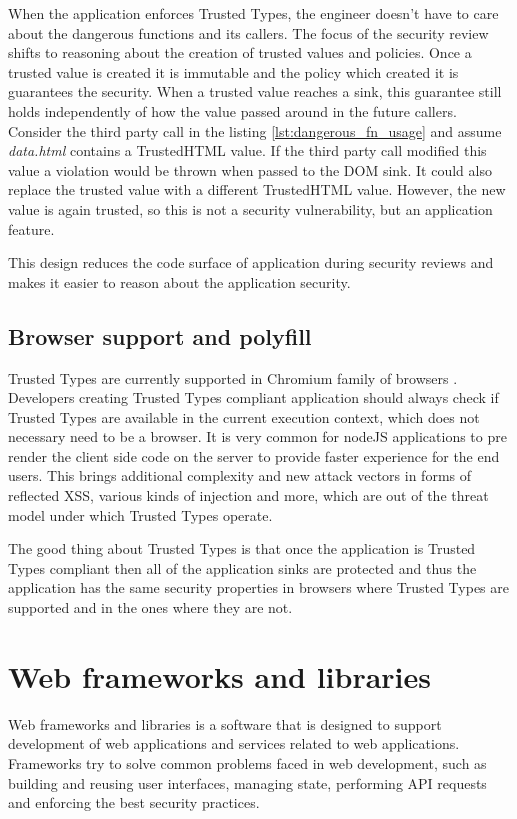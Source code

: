 When the application enforces Trusted Types, the engineer doesn't have to care about the dangerous
functions and its callers. The focus of the security review shifts to reasoning about the creation
of trusted values and policies. Once a trusted value is created it is immutable and the policy which
created it is guarantees the security. When a trusted value reaches a sink, this guarantee still
holds independently of how the value passed around in the future callers. Consider the third party
call in the listing \ref{lst:dangerous_fn_usage} and assume \textit{data.html} contains a
TrustedHTML value. If the third party call modified this value a violation would be thrown when
passed to the DOM sink. It could also replace the trusted value with a different TrustedHTML value.
However, the new value is again trusted, so this is not a security vulnerability, but an application
feature.

This design reduces the code surface of application during security reviews and makes it easier to
reason about the application security.

\subsection{Browser support and polyfill}

Trusted Types are currently supported in Chromium family of browsers \cite{mdn:tt_compatibility}.
Developers creating Trusted Types compliant application should always check if Trusted Types are
available in the current execution context, which does not necessary need to be a browser. It is
very common for nodeJS applications to pre render the client side code on the server to provide
faster experience for the end users. This brings additional complexity and new attack vectors in
forms of reflected XSS, various kinds of injection and more, which are out of the threat model under
which Trusted Types operate.

The good thing about Trusted Types is that once the application is Trusted Types compliant then all
of the application sinks are protected and thus the application has the same security properties in
browsers where Trusted Types are supported and in the ones where they are not.

\section{Web frameworks and libraries}

Web frameworks and libraries is a software that is designed to support development of web
applications and services related to web applications. Frameworks try to solve common problems faced
in web development, such as building and reusing user interfaces, managing state, performing API
requests and enforcing the best security practices.

